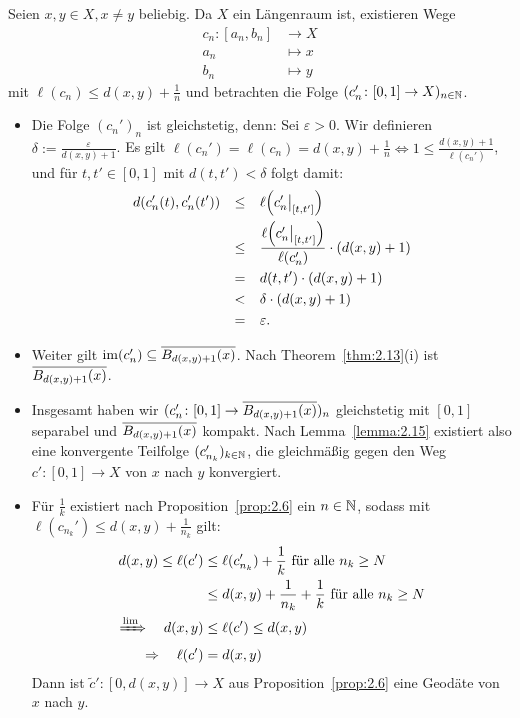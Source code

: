 \begin{beweis}
	Seien $x,y \in X, x\neq y$ beliebig.
	Da $X$ ein Längenraum ist, existieren Wege
	\begin{align*}
		c_n\colon [a_n,b_n] &\longrightarrow X \\
		a_n &\longmapsto x \\
		b_n &\longmapsto y
	\end{align*}
	mit $\ell(c_n) \leq d(x,y) + \frac{1}{n}$ und betrachten die Folge $(c_n'\colon [0,1] \rightarrow X)_{n \in \mathbb{N}}$.
	\begin{itemize}
		\item Die Folge $(c_n')_n$ ist gleichstetig, denn:
		Sei $\varepsilon > 0$.
		Wir definieren $\delta := \frac{\varepsilon}{d(x,y)+1}$. Es gilt $\ell(c_n') = \ell(c_n) = d(x,y) + \frac{1}{n} \Leftrightarrow 1 \leq \frac{d(x,y)+1}{\ell(c_n')}$, und für $t,t' \in [0,1]$ mit $d(t,t') < \delta$ folgt damit:
		\begin{align*}
			d(c_n'(t),c_n'(t')) &\stack{}{\leq} \ell \enbrace*{c_n' \big|_{[t,t']}} \\
			&\stack{}{\leq} \frac{\ell \enbrace*{c_n' \big|_{[t,t']}}}{\ell(c_n')} \cdot (d(x,y) + 1) \\
			&\stack{}{=} d(t,t') \cdot (d(x,y) + 1) \\
			&\stack{}{<} \delta \cdot (d(x,y) + 1) \\
			&\stack{}{=} \varepsilon.
		\end{align*}
		\item Weiter gilt $\operatorname{im}(c_n') \subseteq \overline{B_{d(x,y)+1}(x)}$.
		Nach Theorem~\ref{thm:2.13}(i) ist $\overline{B_{d(x,y)+1}(x)}$.
		\item Insgesamt haben wir $(c_n'\colon [0,1] \rightarrow \overline{B_{d(x,y)+1}(x)})_n$ gleichstetig mit $[0,1]$ separabel und $\overline{B_{d(x,y)+1}(x)}$ kompakt.
		Nach Lemma~\ref{lemma:2.15} existiert also eine konvergente Teilfolge $(c_{n_k}')_{k \in \mathbb{N}}$, die gleichmäßig gegen den Weg $c'\colon [0,1] \rightarrow X$ von $x$ nach $y$ konvergiert.
		\item Für $\frac{1}{k}$ existiert nach Proposition~\ref{prop:2.6} ein $n \in \mathbb{N}$, sodass mit $\ell(c_{n_k}') \leq  d(x,y) + \frac{1}{n_k}$ gilt:
		\begin{align*}
			d(x,y) \leq \ell(c') &\leq \ell(c_{n_k}') + \frac{1}{k} \text{ für alle } n_k \geq N \\
			&\leq d(x,y) + \frac{1}{n_k} + \frac{1}{k} \text{ für alle } n_k \geq N \\
			\xRightarrow{\lim} \quad d(x,y) &\leq \ell(c') \leq d(x,y) \\
			\Rightarrow \quad \ell(c') &= d(x,y)
		\end{align*}
		Dann ist $\tilde{c}' \colon [0,d(x,y)] \rightarrow X$ aus Proposition~\ref{prop:2.6} eine Geodäte von $x$ nach $y$. 
	\end{itemize}
\end{beweis}


